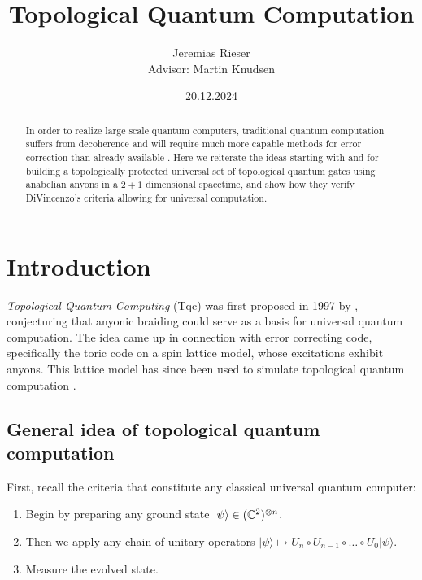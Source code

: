 \documentclass{article}
\begin{document}
\title{Topological Quantum Computation}

\author{Jeremias Rieser \\
Advisor: Martin Knudsen}
\date{20.12.2024}

\maketitle

\begin{abstract}
  In order to realize large scale quantum computers, traditional quantum computation suffers from decoherence and will require much more capable methods for error correction than already available \cite{sau_roadmap_2017}. Here we reiterate the ideas starting with \cite{kitaev_fault-tolerant_1997} and \cite{freedman_topological_2002} for building a topologically protected universal set of topological quantum gates using anabelian anyons in a $2 + 1$ dimensional spacetime, and show how they verify DiVincenzo's criteria allowing for universal computation.
\end{abstract}
\medskip


\section{Introduction}

{\it Topological Quantum Computing} (Tqc) was first proposed in 1997 by \cite{kitaev_fault-tolerant_1997}, conjecturing that anyonic braiding could serve as a basis for universal quantum computation. The idea came up in connection with error correcting code, specifically the toric code on a spin lattice model, whose excitations exhibit anyons. This lattice model has since been used to simulate topological quantum computation \cite{satzinger_realizing_2021}.

\subsection{General idea of topological quantum computation}

First, recall the criteria that constitute any classical universal quantum computer:

\begin{enumerate}
  \item Begin by preparing any ground state $\vert \psi \rangle \in (\mathbb{C}^2)^{\otimes n}$.
  \item Then we apply any chain of unitary operators $ \vert \psi \rangle \mapsto U_n \circ U_{n-1} \circ \ldots \circ U_0 \vert \psi \rangle$.
  \item Measure the evolved state.
\end{enumerate}
\end{document}
